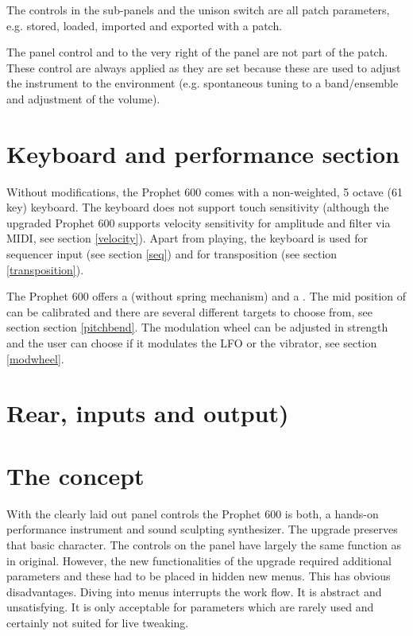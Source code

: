 \documentclass[landscape, 11pt, oneside]{report}
\newenvironment{flowtext}{\addmargin[0cm]{7cm}}{\endaddmargin} %
\begin{document}
\begin{flowtext}
\begin{itemize}
\end{itemize}

The controls in the sub-panels and the unison switch are all patch parameters, e.g. stored, loaded, imported and exported with a patch. 

The panel control \mastertune and \mastervol to the very right of the panel are not part of the patch. These control are always applied as they are set because these are used to adjust the instrument to the environment (e.g. spontaneous tuning to a band/ensemble and adjustment of the volume).

\section{Keyboard and performance section}

Without modifications, the Prophet 600 comes with a non-weighted, 5 octave (61 key) keyboard. The keyboard does not support touch sensitivity (although the upgraded Prophet 600 supports velocity sensitivity for amplitude and filter via MIDI, see section \ref{velocity}). Apart from playing, the keyboard is used for sequencer input (see section \ref{seq}) and for transposition (see section \ref{transposition}). 

The Prophet 600 offers a \pitchbender (without spring mechanism) and a \modwheel. The mid position of \pitchbender can be calibrated and there are several different targets to choose from, see section section \ref{pitchbend}. The modulation wheel can be adjusted in strength and the user can choose if it modulates the LFO or the vibrator, see section \ref{modwheel}.

\section{Rear, inputs and output)}



\section{The concept}

With the clearly laid out panel controls the Prophet 600 is both, a hands-on performance instrument and sound sculpting synthesizer. The upgrade preserves that basic character. The controls on the panel have largely the same function as in original. However, the new functionalities of the upgrade required additional parameters and these had to be placed in hidden new menus. This has obvious disadvantages. Diving into menus interrupts the work flow. It is abstract and unsatisfying. It is only acceptable for parameters which are rarely used and certainly not suited for live tweaking. 


\end{flowtext}
\end{document}
